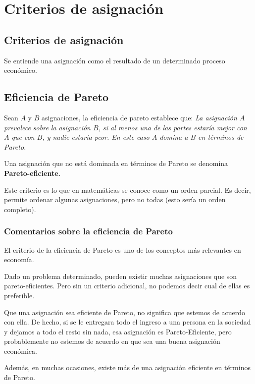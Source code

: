 \section{Criterios de asignación}


\subsection{Criterios de asignación}
Se entiende una asignación como el resultado de un determinado proceso económico.

\subsection{Eficiencia de Pareto}
Sean $A$ y $B$ asignaciones, la eficiencia de pareto establece que:
\hfill \break
\hfill \break
\textit{La asignación $A$ prevalece sobre la asignación $B$, si al menos una de las partes estaría mejor con $A$ que con $B$, y nadie estaría peor. En este caso $A$ domina a $B$ en términos de Pareto.}
\hfill \break


Una asignación que no está dominada en términos de Pareto se denomina \textbf{Pareto-eficiente.}


Este criterio es lo que en matemáticas se conoce como un orden parcial. Es decir, permite ordenar algunas asignaciones, pero no todas (esto sería un orden completo).

\subsubsection{Comentarios sobre la eficiencia de Pareto}
El criterio de la eficiencia de Pareto es uno de los conceptos más relevantes en economía. 


Dado un problema determinado, pueden existir muchas asignaciones que son pareto-eficientes. Pero sin un criterio adicional, no podemos decir cual de ellas es preferible.


Que una asignación sea eficiente de Pareto, no significa que estemos de acuerdo con ella. De hecho, si se le entregara todo el ingreso a una persona en la sociedad y dejamos a todo el resto sin nada, esa asignación es Pareto-Eficiente, pero probablemente no estemos de acuerdo en que sea una buena asignación económica.


Además, en muchas ocasiones, existe más de una asignación eficiente en términos de Pareto.

